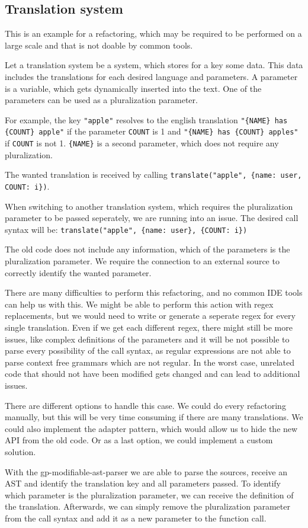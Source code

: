 
\subsection{Translation system}

This is an example for a refactoring, which may be required to be performed on a large scale and that is not doable by common tools.

Let a translation system be a system, which stores for a key some data. This data includes the translations for each desired language and parameters.
A parameter is a variable, which gets dynamically inserted into the text. One of the parameters can be used as a pluralization parameter.

For example, the key \verb|"apple"| resolves to the english translation \verb|"{NAME} has {COUNT} apple"| if the parameter \lstinline|COUNT| is 1 
and \verb|"{NAME} has {COUNT} apples"| if \lstinline|COUNT| is not 1.
\lstinline|{NAME}| is a second parameter, which does not require any pluralization.

The wanted translation is received by calling \lstinline|translate("apple", {name: user, COUNT: i})|.


When switching to another translation system, which requires the pluralization parameter to be passed seperately, we are running into an issue. 
The desired call syntax will be: \lstinline|translate("apple", {name: user}, {COUNT: i})|

The old code does not include any information, which of the parameters is the pluralization parameter. 
We require the connection to an external source to correctly identify the wanted parameter.

There are many difficulties to perform this refactoring, and no common IDE tools can help us with this.
We might be able to perform this action with regex replacements, but we would need to write or generate a seperate regex for every single translation.
Even if we get each different regex, there might still be more issues, like complex definitions of the parameters and it will be not possible to 
parse every possibility of the call syntax, as regular expressions are not able to parse context free grammars which are not regular.
In the worst case, unrelated code that should not have been modified gets changed and can lead to additional issues.

There are different options to handle this case. We could do every refactoring manually, but this will be very time consuming if there are many translations.
We could also implement the adapter pattern, which would allow us to hide the new API from the old code. Or as a last option, we could implement a custom solution.

With the gp-modifiable-ast-parser we are able to parse the sources, receive an AST and identify the translation key and all parameters passed.
To identify which parameter is the pluralization parameter, we can receive the definition of the translation. Afterwards, 
we can simply remove the pluralization parameter
from the call syntax and add it as a new parameter to the function call.